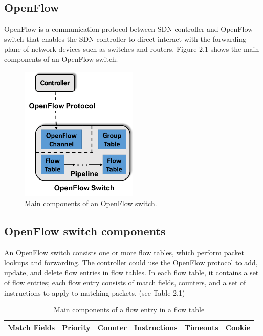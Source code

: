 \documentclass[a4paper,12pt]{report}
\begin{document}
\begin{large}
    \section{OpenFlow}
      \qquad OpenFlow is a communication protocol between SDN controller and OpenFlow switch that enables the SDN 
                controller to direct interact with the forwarding plane of network devices such as switches and 
                routers. Figure 2.1 shows the main components of an OpenFlow switch.
        \begin{figure}[hb]
          \caption{Main components of an OpenFlow switch.}
          \centering
            \includegraphics[width=0.5\textwidth]{OpenFlow.png}
        \end{figure}
        \subsection{OpenFlow switch components}
        \qquad An OpenFlow switch consists one or more flow tables, which perform packet lookups and forwarding. The controller could use the OpenFlow protocol to add, update, and delete flow entries in flow tables. In each flow table, it contains a set of flow entries; each flow entry consists of match fields, counters, and a set of instructions to apply to matching packets. (see Table 2.1)\\
        \begin{table}
          \centering
          \begin{tabular}[c]{|l|l|l|l|l|l|}
          \hline
          Match Fields & Priority & Counter & Instructions & Timeouts & Cookie \\
          \hline
          \end{tabular}
          \caption{Main components of a flow entry in a flow table}
        \end{table}

\end{large}
\end{document}
